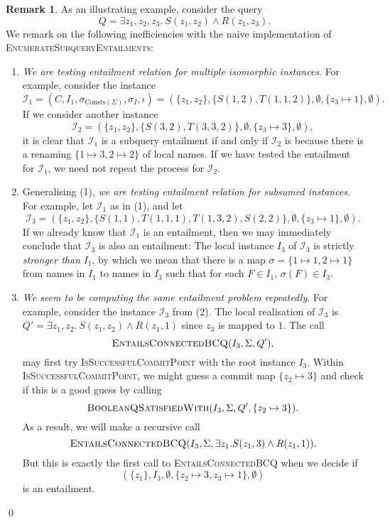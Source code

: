 \documentclass[12pt]{report}
\theoremstyle{plain}
\theoremstyle{definition}
\newtheorem{remark}[theorem]{Remark}
\def\Consts{{\mathrm{Consts}}}
\begin{document}
\begin{remark}
\label{remark:naive-seenumeration-inefficiencies}
  As an illustrating example, consider the query $$Q = \exists z_1,z_2,z_3.\ S(z_1, z_2) \wedge R(z_1, z_3).$$ We remark on the following inefficiencies with the naive implementation  of \textsc{EnumerateSubqueryEntailments}:

  \begin{enumerate}
    \item \textit{We are testing entailment relation for multiple isomorphic instances}. For example, consider the instance $$
      \mathcal{I}_1 = (C, I_1, \sigma_{\Consts(\Sigma)}, \sigma_I, \iota) = (\{z_1, z_2\}, \{ S(1, 2), T(1, 1, 2) \}, \emptyset, \{ z_3 \mapsto 1 \}, \emptyset).
    $$ If we consider another instance $$
      \mathcal{I}_2 = (\{z_1, z_2\}, \{ S(3, 2), T(3, 3, 2) \}, \emptyset, \{ z_3 \mapsto 3 \}, \emptyset),
    $$ it is clear that $\mathcal{I}_1$ is a subquery entailment if and only if $\mathcal{I}_2$ is because there is a renaming $\{ 1 \mapsto 3, 2 \mapsto 2 \}$ of local names. If we have tested the entailment for $\mathcal{I}_1$, we need not repeat the process for $\mathcal{I}_2$.
    \item Generalising (1), \textit{we are testing entailment relation for subsumed instances}. For example, let $\mathcal{I}_1$ as in (1), and let $$
      \mathcal{I}_3 = (\{z_1, z_2\}, \{ S(1, 1), T(1, 1, 1), T(1, 3, 2), S(2, 2) \}, \emptyset, \{ z_3 \mapsto 1 \}, \emptyset).
    $$ If we already know that $\mathcal{I}_1$ is an entailment, then we may immediately conclude that $\mathcal{I}_3$ is also an entailment: The local instance $I_3$ of $\mathcal{I}_3$ is strictly \emph{stronger than} $I_1$, by which we mean that there is a map $\sigma = \{1 \mapsto 1, 2 \mapsto 1\}$ from names in $I_1$ to names in $I_3$ such that for each $F \in I_1$, $\sigma(F) \in I_3$.
    \item \textit{We seem to be computing the same entailment problem repeatedly}. For example, consider the instance $\mathcal{I}_3$ from (2). The local realisation of $\mathcal{I}_3$ is $Q' = \exists z_1, z_2.\ S(z_1, z_2) \wedge R(z_1, 1)$ since $z_3$ is mapped to $1$. The call
    $$\textsc{EntailsConnectedBCQ}(I_3, \Sigma, Q'),$$ may first try \textsc{IsSuccessfulCommitPoint} with the root instance $I_3$. Within \textsc{IsSuccessfulCommitPoint}, we might guess a commit map $\{ z_2 \mapsto 3 \}$ and check if this is a good guess by calling 
    $$\textsc{BooleanQSatisfiedWith}(I_3, \Sigma, Q', \{ z_2 \mapsto 3 \}).$$
    As a result, we will make a recursive call
    $$\textsc{EntailsConnectedBCQ}(I_3, \Sigma, \exists z_1. S(z_1, 3) \wedge R(z_1, 1)).$$ But this is exactly the first call to \textsc{EntailsConnectedBCQ} when we decide if $$(\{z_1\}, I_3, \emptyset, \{ z_2 \mapsto 3, z_3 \mapsto 1 \}, \emptyset)$$ is an entailment.
  \end{enumerate}
  \qed
\end{remark}
\end{document}
